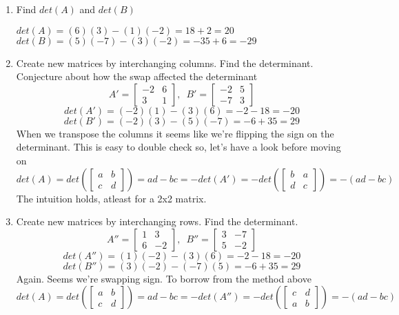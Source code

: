 \documentclass{article}
\begin{document}
            \begin{enumerate}[label=(\alph*)]
                \item Find $det(A)$ and $det(B)$
                    \begin{center}
                        $det(A)=(6)(3)-(1)(-2)=18+2=20$ \\
                        $det(B)=(5)(-7)-(3)(-2)=-35+6=-29$
                    \end{center}
                \item Create new matrices by interchanging columns. Find the determinant.
                      Conjecture about how the swap affected the determinant
                        \[A'=\begin{bmatrix}-2&6\\3&1\end{bmatrix},\enspace B'=\begin{bmatrix}-2&5\\-7&3\end{bmatrix}\]
                        \[det(A')=(-2)(1)-(3)(6)=-2-18=-20\]
                        \[det(B')=(-2)(3)-(5)(-7)=-6+35=29\]
                      When we transpose the columns it seems like we're flipping the sign on the determinant.
                      This is easy to double check so, let's have a look before moving on
                        \[det(A)=det(\begin{bmatrix}a&b\\c&d\end{bmatrix})=ad-bc=-det(A')=-det(\begin{bmatrix}b&a\\d&c\end{bmatrix})=-(ad-bc)\]
                      The intuition holds, atleast for a 2x2 matrix.
                \item Create new matrices by interchanging rows. Find the determinant. 
                        \[A''=\begin{bmatrix}1&3\\6&-2\end{bmatrix},\enspace B''=\begin{bmatrix}3&-7\\5&-2\end{bmatrix}\]
                        \[det(A'')=(1)(-2)-(3)(6)=-2-18=-20\]
                        \[det(B'')=(3)(-2)-(-7)(5)=-6+35=29\]
                      Again. Seems we're swapping sign. To borrow from the method above
                        \[det(A)=det(\begin{bmatrix}a&b\\c&d\end{bmatrix})=ad-bc=-det(A'')=-det(\begin{bmatrix}c&d\\a&b\end{bmatrix})=-(ad-bc)\]

\end{enumerate}
\end{document}

